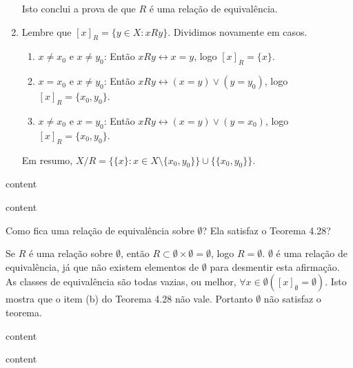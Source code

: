 \begin{solucao}
\begin{enumerate}[label=(\alph{*})]
		Isto conclui a prova de que $R$ é uma relação de equivalência.
		
		\item Lembre que $[x]_R=\{y\in X:xRy\}$. Dividimos novamente em casos.
		\begin{enumerate}[label=Caso \arabic{*}.]
			\item $x\neq x_0$ e $x\neq y_0$: Então $xRy\leftrightarrow x=y$, logo $[x]_R=\{x\}$.
			\item $x= x_0$ e $x\neq y_0$: Então $xRy\leftrightarrow (x=y)\vee (y=y_0)$, logo $[x]_R=\{x_0,y_0\}$.
			\item $x\neq x_0$ e $x= y_0$: Então $xRy\leftrightarrow (x=y)\vee (y=x_0)$, logo $[x]_R=\{x_0,y_0\}$.
		\end{enumerate}
		
		Em resumo, $X/R=\{\{x\}:x\in X\setminus\{x_0,y_0\}\}\cup\{\{x_0,y_0\}\}.$
	\end{enumerate}
\end{solucao}

\begin{exercicio}
	content
\end{exercicio}
\begin{solucao}
	content
\end{solucao}

\begin{exercicio}
	Como fica uma relação de equivalência sobre $\emptyset$? Ela satisfaz o Teorema 4.28?
\end{exercicio}
\begin{solucao}
	Se $R$ é uma relação sobre $\emptyset$, então $R\subset \emptyset\times\emptyset=\emptyset$, logo $R=\emptyset$. $\emptyset$ é uma relação de equivalência, já que não existem elementos de $\emptyset$ para desmentir esta afirmação. As classes de equivalência são todas vazias, ou melhor, $\forall x \in \emptyset ([x]_{\emptyset}=\emptyset)$. Isto mostra que o item (b) do Teorema 4.28 não vale. Portanto $\emptyset$ não satisfaz o teorema.
\end{solucao}

\begin{exercicio}
	content
\end{exercicio}
\begin{solucao}
	content
\end{solucao}

